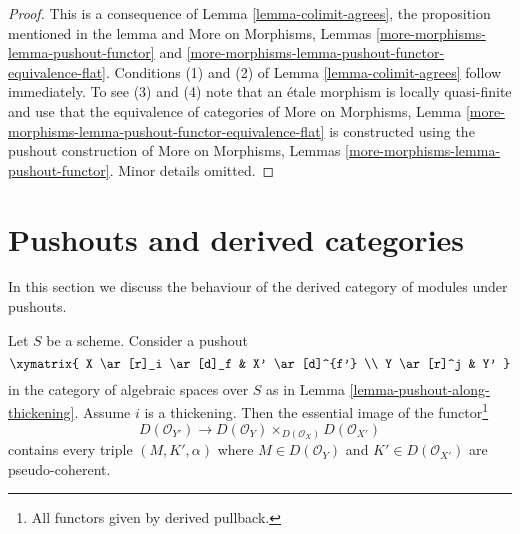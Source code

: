 \begin{proof}
This is a consequence of Lemma \ref{lemma-colimit-agrees}, the proposition
mentioned in the lemma and More on Morphisms, Lemmas
\ref{more-morphisms-lemma-pushout-functor} and
\ref{more-morphisms-lemma-pushout-functor-equivalence-flat}.
Conditions (1) and (2) of Lemma \ref{lemma-colimit-agrees}
follow immediately. To see (3) and (4) note that an \'etale morphism
is locally quasi-finite and use that the equivalence of categories of
More on Morphisms, Lemma
\ref{more-morphisms-lemma-pushout-functor-equivalence-flat}
is constructed using the pushout construction of
More on Morphisms, Lemmas \ref{more-morphisms-lemma-pushout-functor}.
Minor details omitted.
\end{proof}








\section{Pushouts and derived categories}
\label{section-pushouts-derived}

\noindent
In this section we discuss the behaviour of the derived
category of modules under pushouts.

\begin{lemma}
\label{lemma-pushout-along-thickening-derived}
Let $S$ be a scheme. Consider a pushout
$$
\xymatrix{
X \ar[r]_i \ar[d]_f & X' \ar[d]^{f'}
\\
Y \ar[r]^j & Y'
}
$$
in the category of algebraic spaces over $S$
as in Lemma \ref{lemma-pushout-along-thickening}.
Assume $i$ is a thickening. Then the essential
image of the functor\footnote{All functors given by derived pullback.}
$$
D(\mathcal{O}_{Y'}) \longrightarrow
D(\mathcal{O}_Y) \times_{D(\mathcal{O}_X)} D(\mathcal{O}_{X'})
$$
contains every triple $(M, K', \alpha)$ where $M \in D(\mathcal{O}_Y)$
and $K' \in D(\mathcal{O}_{X'})$ are pseudo-coherent.
\end{lemma}

